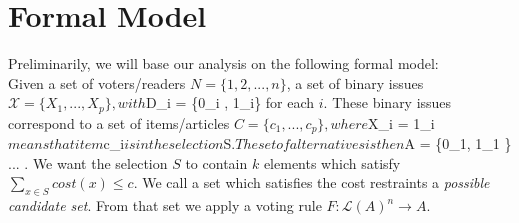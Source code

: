 \documentclass[10pt,a4paper, english]{article}
\begin{document}
\section{Formal Model}
Preliminarily, we will base our analysis on the following formal model:\\
Given a set of voters/readers $N=\{1,2, ..., n\}$, a set of binary issues $\mathcal{X} = \{X_1 , ... , X_p\}, with $D_i = \{0_i , 1_i\} for each $i$. These binary issues correspond to a set of items/articles $C =\{c_1 , ... , c_p\}, where $X_i = 1_i$ means that item $c_i$ is in the selection $S$. The set of alternatives is then $A = \{0_1, 1_1 \} \times ... . We want the selection $S$ to contain $k$ elements which satisfy $\sum_{x \in S}cost(x) \leq c$. We call a set which satisfies the cost restraints a \textit{possible candidate set}. From that set we apply a voting rule $F:\mathcal{L}(A)^n \rightarrow A$.
\end{document}
